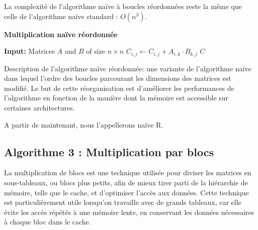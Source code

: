 \documentclass[../CSC_5RO06_TA.tex]{subfiles}
\begin{document}
La complexité de l'algorithme naïve à boucles réordonnées reste la même que celle de l'algorithme naïve standard : $O(n^3)$.

\begin{algorithm}
\caption{\textbf{Multiplication naïve réordonnée}}
\begin{algorithmic}[1]
    \State \textbf{Input:} Matrices $A$ and $B$ of size $n \times n$
     
         
             
                \State $C_{i,j} \gets C_{i,j} + A_{i,k} \cdot B_{k,j}$
            \EndFor
        \EndFor
    \EndFor
    \State \Return $C$
\end{algorithmic}
\end{algorithm}

Description de l'algorithme naïve réordonnée: une variante de l'algorithme naïve dans lequel l'ordre des boucles parcourant les dimensions des matrices est modifié. Le but de cette réorganisation est d'améliorer les performances de l'algorithme en fonction de la manière dont la mémoire est accessible sur certaines architectures.

A partir de maintenant, nous l'appellerons naïve R.

\subsection{Algorithme 3 : Multiplication par blocs}

La multiplication de blocs est une technique utilisée pour diviser les matrices en sous-tableaux, ou blocs plus petits, afin de mieux tirer parti de la hiérarchie de mémoire, telle que le cache, et d'optimiser l'accès aux données. Cette technique est particulièrement utile lorsqu'on travaille avec de grands tableaux, car elle évite les accès répétés à une mémoire lente, en conservant les données nécessaires à chaque bloc dans le cache.
\end{document}
